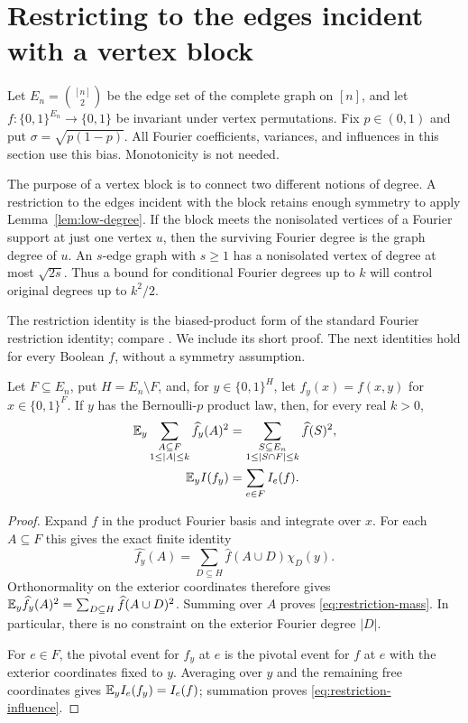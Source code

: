 \section{Restricting to the edges incident with a vertex block}
\label{sec:graph}

Let $E_n=\binom{[n]}2$ be the edge set of the complete graph on $[n]$,
and let $f\colon\{0,1\}^{E_n}\to\{0,1\}$ be invariant under vertex
permutations.  Fix $p\in(0,1)$ and put $\sigma=\sqrt{p(1-p)}$.
All Fourier coefficients, variances, and influences in this section
use this bias.  Monotonicity is not needed.

The purpose of a vertex block is to connect two different notions of
degree.  A restriction to the edges incident with the block retains
enough symmetry to apply Lemma~\ref{lem:low-degree}.  If the block meets
the nonisolated vertices of a Fourier support at just one vertex $u$,
then the surviving Fourier degree is the graph degree of $u$.
An $s$-edge graph with $s\ge1$ has a nonisolated vertex of degree at most
$\sqrt{2s}$.  Thus a bound for conditional Fourier degrees up to $k$
will control original degrees up to $k^2/2$.

The restriction identity is the biased-product form of the standard
Fourier restriction identity; compare
\cite[arXiv version~2, Lemma~2.7]{KKLMS20}.
We include its short proof. The next identities hold for every Boolean
$f$, without a symmetry assumption.

\begin{lemma}
\label{lem:restriction}
Let $F\subseteq E_n$, put $H=E_n\setminus F$, and, for
$y\in\{0,1\}^{H}$, let $f_y(x)=f(x,y)$ for
$x\in\{0,1\}^{F}$.  If $y$ has the Bernoulli-$p$ product law, then,
for every real $k>0$,
\begin{align}
 \mathbb E_y\sum_{\substack{A\subseteq F\\1\le |A|\le k}}
        \widehat{f_y}(A)^2
 &=\sum_{\substack{S\subseteq E_n\\1\le|S\cap F|\le k}}
        \widehat f(S)^2,
 \label{eq:restriction-mass}\\
 \mathbb E_y I(f_y)&=\sum_{e\in F}I_e(f).
 \label{eq:restriction-influence}
\end{align}
\end{lemma}

\begin{proof}
Expand $f$ in the product Fourier basis and integrate over $x$.
For each $A\subseteq F$ this gives the exact finite identity
\[
 \widehat{f_y}(A)
 =\sum_{D\subseteq H}\widehat f(A\cup D)\chi_D(y).
\]
Orthonormality on the exterior coordinates therefore gives
$\mathbb E_y\widehat{f_y}(A)^2
=\sum_{D\subseteq H}\widehat f(A\cup D)^2$.
Summing over $A$ proves \eqref{eq:restriction-mass}.  In particular,
there is no constraint on the exterior Fourier degree $|D|$.

For $e\in F$, the pivotal event for $f_y$ at $e$ is the pivotal event
for $f$ at $e$ with the exterior coordinates fixed to $y$.  Averaging
over $y$ and the remaining free coordinates gives
$\mathbb E_y I_e(f_y)=I_e(f)$; summation proves
\eqref{eq:restriction-influence}.
\end{proof}

